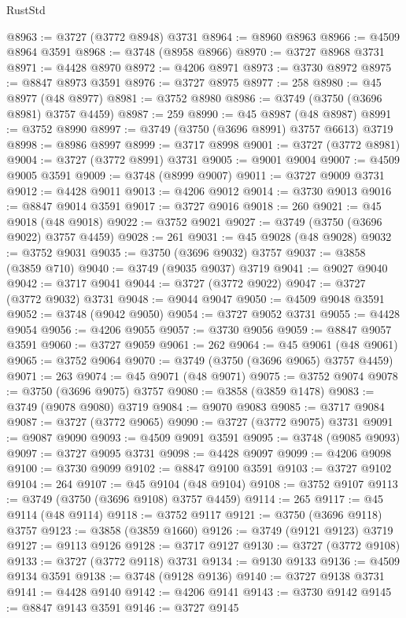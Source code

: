 \begin{lexlean}{RustStd}
\begin{coremodule}
@8963 := @3727 (@3772 @8948) @3731
@8964 := @8960 @8963
@8966 := @4509 @8964 @3591
@8968 := @3748 (@8958 @8966)
@8970 := @3727 @8968 @3731
@8971 := @4428 @8970
@8972 := @4206 @8971
@8973 := @3730 @8972
@8975 := @8847 @8973 @3591
@8976 := @3727 @8975
@8977 := 258
@8980 := @45 @8977 (@48 @8977)
@8981 := @3752 @8980
@8986 := @3749 (@3750 (@3696 @8981) @3757 @4459)
@8987 := 259
@8990 := @45 @8987 (@48 @8987)
@8991 := @3752 @8990
@8997 := @3749 (@3750 (@3696 @8991) @3757 @6613) @3719
@8998 := @8986 @8997
@8999 := @3717 @8998
@9001 := @3727 (@3772 @8981)
@9004 := @3727 (@3772 @8991) @3731
@9005 := @9001 @9004
@9007 := @4509 @9005 @3591
@9009 := @3748 (@8999 @9007)
@9011 := @3727 @9009 @3731
@9012 := @4428 @9011
@9013 := @4206 @9012
@9014 := @3730 @9013
@9016 := @8847 @9014 @3591
@9017 := @3727 @9016
@9018 := 260
@9021 := @45 @9018 (@48 @9018)
@9022 := @3752 @9021
@9027 := @3749 (@3750 (@3696 @9022) @3757 @4459)
@9028 := 261
@9031 := @45 @9028 (@48 @9028)
@9032 := @3752 @9031
@9035 := @3750 (@3696 @9032) @3757
@9037 := @3858 (@3859 @710)
@9040 := @3749 (@9035 @9037) @3719
@9041 := @9027 @9040
@9042 := @3717 @9041
@9044 := @3727 (@3772 @9022)
@9047 := @3727 (@3772 @9032) @3731
@9048 := @9044 @9047
@9050 := @4509 @9048 @3591
@9052 := @3748 (@9042 @9050)
@9054 := @3727 @9052 @3731
@9055 := @4428 @9054
@9056 := @4206 @9055
@9057 := @3730 @9056
@9059 := @8847 @9057 @3591
@9060 := @3727 @9059
@9061 := 262
@9064 := @45 @9061 (@48 @9061)
@9065 := @3752 @9064
@9070 := @3749 (@3750 (@3696 @9065) @3757 @4459)
@9071 := 263
@9074 := @45 @9071 (@48 @9071)
@9075 := @3752 @9074
@9078 := @3750 (@3696 @9075) @3757
@9080 := @3858 (@3859 @1478)
@9083 := @3749 (@9078 @9080) @3719
@9084 := @9070 @9083
@9085 := @3717 @9084
@9087 := @3727 (@3772 @9065)
@9090 := @3727 (@3772 @9075) @3731
@9091 := @9087 @9090
@9093 := @4509 @9091 @3591
@9095 := @3748 (@9085 @9093)
@9097 := @3727 @9095 @3731
@9098 := @4428 @9097
@9099 := @4206 @9098
@9100 := @3730 @9099
@9102 := @8847 @9100 @3591
@9103 := @3727 @9102
@9104 := 264
@9107 := @45 @9104 (@48 @9104)
@9108 := @3752 @9107
@9113 := @3749 (@3750 (@3696 @9108) @3757 @4459)
@9114 := 265
@9117 := @45 @9114 (@48 @9114)
@9118 := @3752 @9117
@9121 := @3750 (@3696 @9118) @3757
@9123 := @3858 (@3859 @1660)
@9126 := @3749 (@9121 @9123) @3719
@9127 := @9113 @9126
@9128 := @3717 @9127
@9130 := @3727 (@3772 @9108)
@9133 := @3727 (@3772 @9118) @3731
@9134 := @9130 @9133
@9136 := @4509 @9134 @3591
@9138 := @3748 (@9128 @9136)
@9140 := @3727 @9138 @3731
@9141 := @4428 @9140
@9142 := @4206 @9141
@9143 := @3730 @9142
@9145 := @8847 @9143 @3591
@9146 := @3727 @9145

\end{coremodule}
\end{lexlean}
